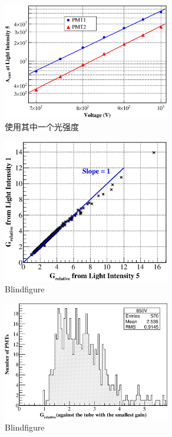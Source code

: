 \begin{figure}[htbp]
	\centering
	\includegraphics[width=0.65\textwidth]{chap/pmt_test/fig/gain_vs_voltage.eps}
	\caption{使用其中一个光强度}
	\label{fig:pmt_test:gain_vs_voltage}
\end{figure}

\begin{figure}[htbp]
	\centering
	\includegraphics[width=0.65\textwidth]{chap/pmt_test/fig/gain_twointensity_correlation.eps}
	\caption{Blindfigure}
	\label{fig:pmt_test:gain_twointensity_correlation}
\end{figure}

\begin{figure}[htbp]
	\centering
	\includegraphics[width=0.65\textwidth]{chap/pmt_test/fig/gain_distribution_850.eps}
	\caption{Blindfigure}
	\label{fig:pmt_test:gain_distribution_850}
\end{figure}

